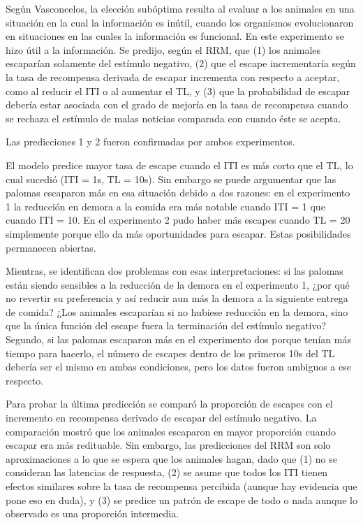 \documentclass[a4paper,12pt]{article}
\begin{document}
Según Vasconcelos, la elección subóptima resulta al evaluar a los animales en una situación en la cual la información es inútil, cuando los organismos evolucionaron en situaciones en las cuales la información es funcional. En este experimento se hizo útil a la información. Se predijo, según el RRM, que (1) los animales escaparían solamente del estímulo negativo, (2) que el escape incrementaría según la tasa de recompensa derivada de escapar incrementa con respecto a aceptar, como al reducir el ITI o al aumentar el TL, y (3) que la probabilidad de escapar debería estar asociada con el grado de mejoría en la tasa de recompensa cuando se rechaza el estímulo de malas noticias comparada con cuando éste se acepta.

Las predicciones 1 y 2 fueron confirmadas por ambos experimentos.

El modelo predice mayor tasa de escape cuando el ITI es más corto que el TL, lo cual sucedió (ITI = 1s, TL = 10s). Sin embargo se puede argumentar que las palomas escaparon más en esa situación debido a dos razones: en el experimento 1 la reducción en demora a la comida era más notable cuando ITI = 1 que cuando ITI = 10. En el experimento 2 pudo haber más escapes cuando TL = 20 simplemente porque ello da más oportunidades para escapar. Estas posibilidades permanecen abiertas.

Mientras, se identifican dos problemas con esas interpretaciones: si las palomas están siendo sensibles a la reducción de la demora en el experimento 1, ¿por qué no revertir su preferencia y así reducir aun más la demora a la siguiente entrega de comida? ¿Los animales escaparían si no hubiese reducción en la demora, sino que la única función del escape fuera la terminación del estímulo negativo? Segundo, si las palomas escaparon más en el experimento dos porque tenían más tiempo para hacerlo, el número de escapes dentro de los primeros 10s del TL debería ser el mismo en ambas condiciones, pero los datos fueron ambiguos a ese respecto.

Para probar la última predicción se comparó la proporción de escapes con el incremento en recompensa derivado de escapar del estímulo negativo. La comparación mostró que los animales escaparon en mayor proporción cuando escapar era más redituable. Sin embargo, las predicciones del RRM son solo aproximaciones a lo que se espera que los animales hagan, dado que (1) no se consideran las latencias de respuesta, (2) se asume que todos los ITI tienen efectos similares sobre la tasa de recompensa percibida (aunque hay evidencia que pone eso en duda), y (3) se predice un patrón de escape de todo o nada aunque lo observado es una proporción intermedia.
\end{document}
